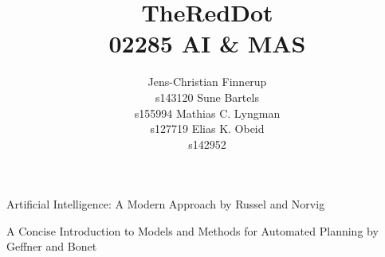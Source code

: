 \documentclass[letterpaper]{article}
\begin{document}
\title{TheRedDot\\02285 AI \& MAS}
\author{
Jens-Christian Finnerup \\ s143120 \And 
Sune Bartels \\ s155994 \And 
Mathias C. Lyngman \\ s127719 \And 
Elias K. Obeid \\ s142952}

\maketitle

Artificial Intelligence: A Modern Approach by Russel and Norvig~\cite{russell2009modern}

A Concise Introduction to Models and Methods for Automated Planning by Geffner and Bonet~\cite{geffner2013concise}












\end{document}
